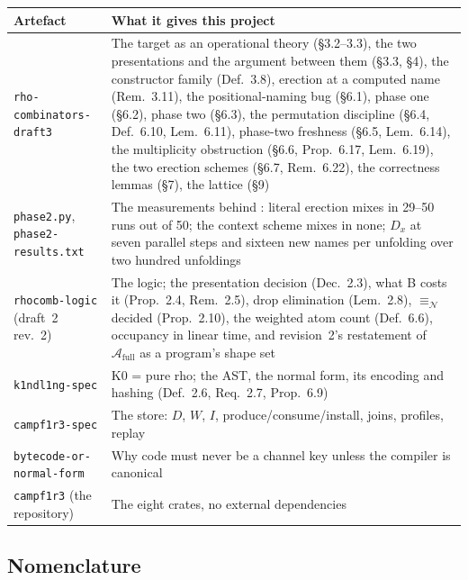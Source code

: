\documentclass[11pt,a4paper]{article}
\newcommand{\code}[1]{\texttt{#1}}
\newcommand{\nequiv}{\equiv_{\mathcal{N}}}
\newcommand{\Atm}{\mathcal{A}}
\theoremstyle{definition}
\theoremstyle{plain}
\begin{document}
\begin{center}
\begin{tabularx}{\linewidth}{@{}l>{\raggedright\arraybackslash}X@{}}
\toprule
Artefact & What it gives this project\\
\midrule
\code{rho-combinators-draft3} & The target as an operational theory
(\S3.2--3.3), the two presentations and the argument between them (\S3.3,
\S4), the constructor family (Def.~3.8), erection at a computed name
(Rem.~3.11), the positional-naming bug (\S6.1), phase one (\S6.2), phase two
(\S6.3), the permutation discipline (\S6.4, Def.~6.10, Lem.~6.11), phase-two
freshness (\S6.5, Lem.~6.14), the multiplicity obstruction (\S6.6,
Prop.~6.17, Lem.~6.19), the two erection schemes (\S6.7, Rem.~6.22), the
correctness lemmas (\S7), the lattice (\S9)\\
\code{phase2.py}, \code{phase2-results.txt} & The measurements behind
\cite[Rem.~6.22]{draft3}: literal erection mixes in 29--50 runs out of 50; the
context scheme mixes in none; $D_{x}$ at seven parallel steps and sixteen new
names per unfolding over two hundred unfoldings\\
\code{rhocomb-logic} (draft~2 rev.~2) & The logic; the presentation decision
(Dec.~2.3), what B costs it (Prop.~2.4, Rem.~2.5), drop elimination
(Lem.~2.8), $\nequiv$ decided (Prop.~2.10), the weighted atom count
(Def.~6.6), occupancy in linear time, and revision~2's restatement of
$\Atm_{\mathrm{full}}$ as a program's shape set\\
\code{k1ndl1ng-spec} & K0 = pure rho; the AST, the normal form, its encoding
and hashing (Def.~2.6, Req.~2.7, Prop.~6.9)\\
\code{campf1r3-spec} & The store: $D$, $W$, $I$, produce/consume/install,
joins, profiles, replay\\
\code{bytecode-or-normal-form} & Why code must never be a channel key unless
the compiler is canonical\\
\code{campf1r3} (the repository) & The eight crates, no external
dependencies\\
\bottomrule
\end{tabularx}
\end{center}

\subsection{Nomenclature}\label{sec:nomen}
\end{document}
